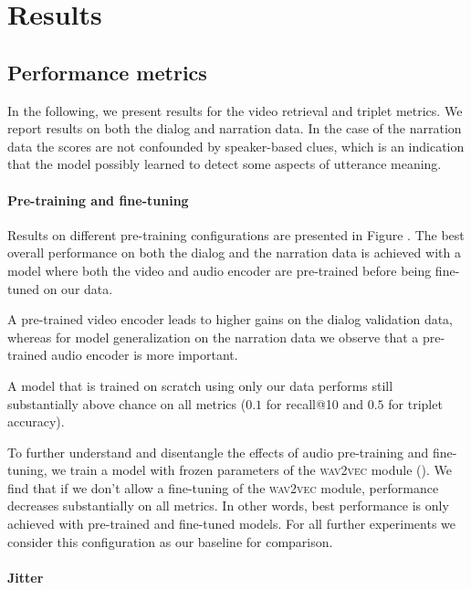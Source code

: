 \section{Results}
\label{sec:results}
\subsection{Performance metrics}

In the following, we present results for the video retrieval and triplet 
metrics.
We report results on both the dialog and narration data.
In the case of the narration data the scores are not confounded by
speaker-based clues, which is an indication that the model possibly
learned to detect some aspects of utterance meaning. 

\paragraph{Pre-training and fine-tuning}
Results on different pre-training configurations are presented in Figure 
.
The best overall performance on both the dialog and the narration data is 
achieved with a model where both the video and audio encoder are pre-trained 
before being fine-tuned on our data.

A pre-trained video encoder leads to higher gains on the dialog validation 
data, whereas for model generalization on the narration data we observe that a 
pre-trained audio encoder is more important. 

A model that is trained on scratch using only our data performs still 
substantially above chance on all metrics ($0.1$ for recall@10 and $0.5$ for 
triplet accuracy). 

To further understand and disentangle the effects of audio pre-training and 
fine-tuning, we train a model with frozen parameters of the 
\textsc{wav2vec} 
module (). We find that if we don't allow a 
fine-tuning of the \textsc{wav2vec} module, performance decreases substantially 
on all 
metrics. In other words, best performance is only achieved with pre-trained and 
fine-tuned models. For all further experiments we consider this configuration 
as our baseline for comparison.

\paragraph{Jitter}

